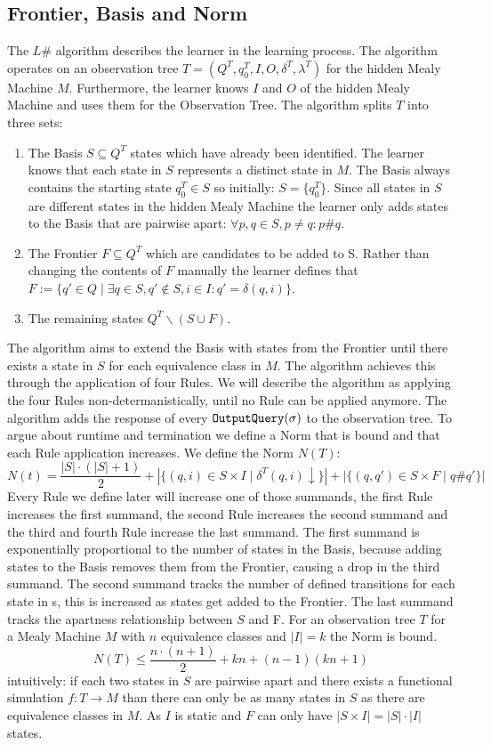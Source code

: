 \subsection{Frontier, Basis and Norm}
The $L\#$ algorithm describes the learner in the learning process. The algorithm operates on an observation tree $T=(Q^T,q_0^T,I,O,\delta^T,\lambda^T)$ for the hidden Mealy Machine $M$. Furthermore, the learner knows $I$ and $O$ of the hidden Mealy Machine and uses them for the Observation Tree. 
The algorithm splits $T$ into three sets:
\begin{enumerate}
	\item The Basis $S\subseteq Q^T$ states which have already been identified. The learner knows that each state in $S$ represents a distinct state in $M$. The Basis always contains the starting state $q_0^T\in S$ so initially: $S=\{q_0^T\}$. Since all states in $S$ are different states in the hidden Mealy Machine the learner only adds states to the Basis that are pairwise apart: $\forall p,q\in S, p\neq q: p\#q$.
	\item The Frontier $F\subseteq Q^T$ which are candidates to be added to S. Rather than changing the contents of $F$ manually the learner defines that $F:=\{q'\in Q\mid \exists q\in S, q'\notin S, i\in I: q'=\delta(q,i)\}$.
	\item The remaining states $Q^T\backslash(S\cup F)$.
\end{enumerate}
The algorithm aims to extend the Basis with states from the Frontier until there exists a state in $S$ for each equivalence class in $M$. The algorithm achieves this through the application of four Rules. We will describe the algorithm as applying the four Rules non-determanistically, until no Rule can be applied anymore. The algorithm adds the response of every $\textnormal{\texttt{OutputQuery}}(\sigma)$ to the observation tree. To argue about runtime and termination we define a Norm that is bound and that each Rule application increases. We define the Norm $N(T)$: 
$$
N(t)=\frac{|S|\cdot(|S|+1)}{2}+|\{(q,i)\in S\times I\mid \delta^T(q,i)\downarrow\}|+|\{(q,q')\in S\times F\mid q\#q'\}|
$$
Every Rule we define later will increase one of those summands, the first Rule increases the first summand, the second Rule increases the second summand and the third and fourth Rule increase the last summand.
The first summand is exponentially proportional to the number of states in the Basis, because adding states to the Basis removes them from the Frontier, causing a drop in the third summand. The second summand tracks the number of defined transitions for each state in s, this is increased as states get added to the Frontier. The last summand tracks the apartness relationship between $S$ and F. For an observation tree $T$ for a Mealy Machine $M$ with $n$ equivalence classes and $|I|=k$ the Norm is bound. $$N(T)\leq\frac{n\cdot(n+1)}{2}+kn+(n-1)(kn+1)$$ %
intuitively: if each two states in $S$ are pairwise apart and there exists a functional simulation $f:T\rightarrow M$ than there can only be as many states in $S$ as there are equivalence classes in $M$. As $I$ is static and $F$ can only have $|S\times I|=|S|\cdot|I|$ states.\\

